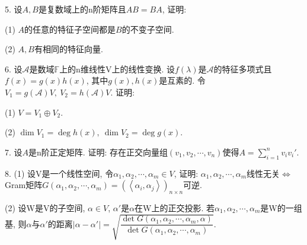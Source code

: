 \documentclass[12pt, a4paper, twoside]{ctexart}%
\begin{document}
{	5. 设$A,B$是复数域上的n阶矩阵且$AB=BA$, 证明: \par
	\hspace{1.2em}(1) $A$的任意的特征子空间都是$B$的不变子空间.\par
	\hspace{1.2em}(2) $A,B$有相同的特征向量.\par
	6. 设$\mathscr{A}$是数域$\mathbb{F}$上的n维线性V上的线性变换. 设$f(\lambda)$是$\mathscr{A}$的特征多项式且$f(x)=g(x)h(x)$, 其中$g(x),h(x)$是互素的. 令$V_1=g(\mathscr{A})V,\ V_2=h(\mathscr{A})V$. 证明: \par
	\hspace{1.2em}(1) $V=V_1\oplus V_2$.\par
	\hspace{1.2em}(2) $\dim V_1=\deg h(x),\ \dim V_2=\deg g(x)$.\par 
	7. 设$A$是n阶正定矩阵. 证明: 存在正交向量组$(v_1,v_2,\cdots,v_n)$使得$A=\sum\limits_{i=1}^n v_i{v_i}'$.\par 
	8. (1) 设V是一个线性空间, 令$\alpha_1,\alpha_2,\cdots,\alpha_m\in V$, 证明: $\alpha_1,\alpha_2,\cdots,\alpha_m$线性无关$\iff$Gram矩阵$G(\alpha_1,\alpha_2,\cdots,\alpha_m)=\left(\left<\alpha_i,\alpha_j\right>\right)_{n\times n}$可逆. \par
	\hspace{1.2em}(2) 设W是V的子空间, $\alpha\in V$, $\alpha'$是$\alpha$在W上的正交投影. 若$\alpha_1,\alpha_2,\cdots,\alpha_m$是W的一组基, 则$\alpha$与$\alpha'$的距离$|\alpha-\alpha'|=\sqrt{\dfrac{\det G(\alpha_1,\alpha_2,\cdots,\alpha_m,\alpha)}{\det G(\alpha_1,\alpha_2,\cdots,\alpha_m)}}$.\par 
}
	\clearpage
\end{document}
